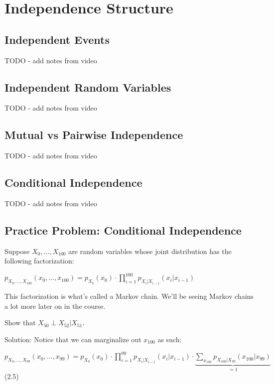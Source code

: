 \documentclass[6008notes.tex]{subfiles}
\begin{document}
\graphicspath{ {images/indepstruct/} }

\section{Independence Structure}

\subsection{Independent Events}

TODO - add notes from video

\subsection{Independent Random Variables}

TODO - add notes from video

\subsection{Mutual vs Pairwise Independence}

TODO - add notes from video

\subsection{Conditional Independence}

TODO - add notes from video

\subsection{Practice Problem: Conditional Independence}

Suppose $X_0, \dots , X_{100}$ are random variables whose joint distribution has the following factorization:

{\centering$p_{X_0, \dots , X_{100}}(x_0, \dots , x_{100}) = p_{X_0}(x_0) \cdot \prod _{i=1}^{100} p_{X_ i | X_{i-1}}(x_ i | x_{i-1})$ \par}
 
This factorization is what's called a Markov chain. We'll be seeing Markov chains a lot more later on in the course.

Show that $X_{50} \perp X_{52} | X_{51}$.

Solution: Notice that we can marginalize out $x_{100}$ as such:

{\centering$p_{X_0, \dots , X_{99}}(x_0, \dots , x_{99}) = p_{X_0}(x_0) \cdot \prod _{i=1}^{99} p_{X_ i | X_{i-1}}(x_ i | x_{i-1}) \cdot \underbrace{\sum _{x_{100}} p_{X_{100}|X_{99}}(x_{100}|x_{99})}_{= 1} \qquad\qquad$ (2.5) \par}
 
\end{document}
